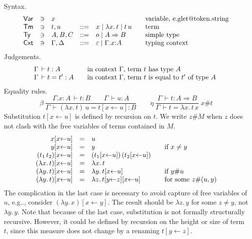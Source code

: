 \documentclass[a4paper,fleqn]{scrartcl}
\makeatletter
\DeclareRobustCommand\onedot{\futurelet\@let@token\@onedot}
\def\@onedot{\ifx\@let@token.\else.\null\fi\xspace}
\def\eg{e.g\onedot}
\newcommand{\To}{\Rightarrow}
\newcommand{\der}{\,\vdash}
\newcommand{\subst}[3]{#3[#2{\leftarrow}#1]}
\newcommand{\substp}[3]{(#3)[#2{\leftarrow}#1]}
\newcommand{\ru}[2]{\dfrac{#1}{#2}}
\newcommand{\nru}[3]{#1\ \ru{#2}{#3}}
\newcommand{\nrux}[4]{\nru{#1}{#2}{#3}\ #4}
\newcommand{\Var}{\mathsf{Var}}
\newcommand{\Ty}{\mathsf{Ty}}
\newcommand{\Tm}{\mathsf{Tm}}
\newcommand{\Cxt}{\mathsf{Cxt}}
\makeatother
\begin{document}
Syntax.
\[
\begin{array}{lllrl@{\qquad}l}
\Var & \ni & x & & & \mbox{variable, \eg string} \\
\Tm & \ni & t,u & ::= & x \mid \lambda x.\,t \mid t \, u & \mbox{term}
  \\
\Ty  & \ni & A,B,C & ::= & o \mid A \To B & \mbox{simple type} \\
\Cxt & \ni & \Gamma, \Delta & ::= & \varepsilon \mid \Gamma.x{:}A
  & \mbox{typing context}\\
\end{array}
\]
Judgements.
\[
\begin{array}{l@{\qquad}l}
  \Gamma \der t : A & \mbox{in context $\Gamma$, term $t$ has type $A$ } \\
  \Gamma \der t = t' : A & \mbox{in context $\Gamma$, term $t$ is equal to $t'$ of type $A$ } \\
\end{array}
\]
Equality rules.
\[
  \nru{\beta
    }{\Gamma.x{:}A \der t : B \qquad \Gamma \der u : A
    }{\Gamma \der (\lambda x.\,t)\,u = \subst u x t : B
    }
\qquad
  \nrux{\eta
   }{\Gamma \der t : A \To B
   }{\Gamma \der t = \lambda x.\,t\,x
   }{x\#t}
\]
Substitution $\subst u x t$ is defined by recursion on $t$.
We write $z\#M$ when $z$ does not clash with the free variables of
terms contained in $M$.
\[
\begin{array}{rll@{\qquad}l}
  \subst u x x & = & u \\
  \subst u x y & = & y & \mbox{if } x \not= y \\
  \subst u x {(t_1\,t_2)} & = & (\subst u x {t_1})\, (\subst u x {t_2}) \\
  \subst u x {(\lambda x.\,t)} & = & \lambda x.\,t \\
  \subst u x {(\lambda y.\,t)} & = & \lambda y.\,{\subst u x t}
    & \mbox{if } y\#u \\
  \subst u x {(\lambda y.\,t)} & = & \lambda z.\,{\subst u x {\subst z y t}}
    & \mbox{for some } z\#(u,y) \\
\end{array}
\]
The complication in the last case is necessary to avoid capture of
free variables of $u$, \eg, consider $\substp y x {\lambda y.\,x}$.
The result should be $\lambda z.\,y$ for some $z \not= y$, not
$\lambda y.\,y$.
Note that because of the last case, substitution is not formally
structurally recursive.  However, it could be defined by recursion on
the height or size of term $t$, since this measure does not change by
a renaming $\subst z y t$.
\end{document}
